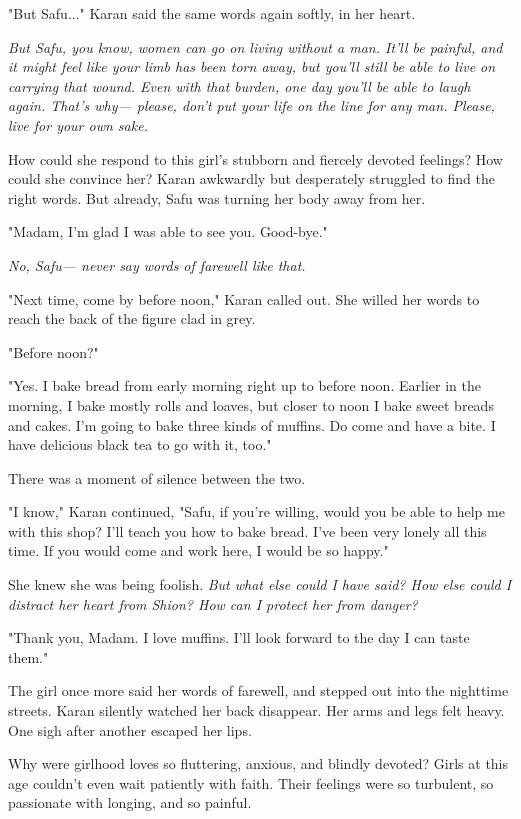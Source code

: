 "But Safu..." Karan said the same words again softly, in her heart.

\emph{But Safu, you know, women can go on living without a man. It'll be
painful, and it might feel like your limb has been torn away, but you'll
still be able to live on carrying that wound. Even with that burden, one
day you'll be able to laugh again. That's why--- please, don't put your
life on the line for any man. Please, live for your own sake.}

How could she respond to this girl's stubborn and fiercely devoted
feelings? How could she convince her? Karan awkwardly but desperately
struggled to find the right words. But already, Safu was turning her
body away from her.

"Madam, I'm glad I was able to see you. Good-bye."

\emph{No, Safu--- never say words of farewell like that.}

"Next time, come by before noon," Karan called out. She willed her words
to reach the back of the figure clad in grey.

"Before noon?"

"Yes. I bake bread from early morning right up to before noon. Earlier
in the morning, I bake mostly rolls and loaves, but closer to noon I
bake sweet breads and cakes. I'm going to bake three kinds of muffins.
Do come and have a bite. I have delicious black tea to go with it, too."

There was a moment of silence between the two.

"I know," Karan continued, "Safu, if you're willing, would you be able
to help me with this shop? I'll teach you how to bake bread. I've been
very lonely all this time. If you would come and work here, I would be
so happy."

She knew she was being foolish. \emph{But what else could I have said? How
else could I distract her heart from Shion? How can I protect her from
danger?}

"Thank you, Madam. I love muffins. I'll look forward to the day I can
taste them."

The girl once more said her words of farewell, and stepped out into the
nighttime streets. Karan silently watched her back disappear. Her arms
and legs felt heavy. One sigh after another escaped her lips.

Why were girlhood loves so fluttering, anxious, and blindly devoted?
Girls at this age couldn't even wait patiently with faith. Their
feelings were so turbulent, so passionate with longing, and so painful.

